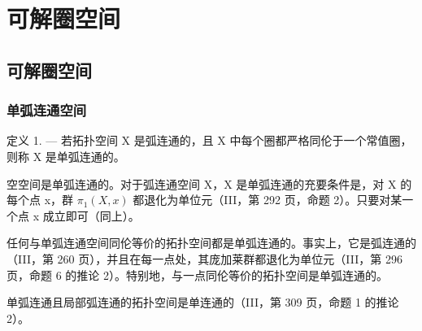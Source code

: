 \chapter{可解圈空间}

\section{可解圈空间}

\subsection{单弧连通空间}

定义 1. --- 若拓扑空间 X 是弧连通的，且 X 中每个圈都严格同伦于一个常值圈，则称 X 是单弧连通的。

空空间是单弧连通的。对于弧连通空间 X，X 是单弧连通的充要条件是，对 X 的每个点 x，群 \(\pi_{1}(X,x)\) 都退化为单位元（III，第 292 页，命题 2）。只要对某一个点 x 成立即可（同上）。

任何与单弧连通空间同伦等价的拓扑空间都是单弧连通的。事实上，它是弧连通的（III，第 260 页），并且在每一点处，其庞加莱群都退化为单位元（III，第 296 页，命题 6 的推论 2）。特别地，与一点同伦等价的拓扑空间是单弧连通的。

单弧连通且局部弧连通的拓扑空间是单连通的（III，第 309 页，命题 1 的推论 2）。
